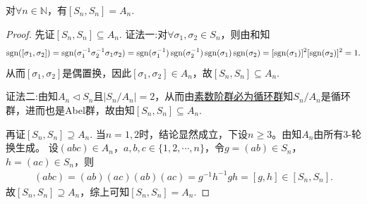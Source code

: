 \documentclass[../../main.tex]{subfiles}%
\begin{document}
\begin{proposition}\label{proposition:SnSn=An}
对$\forall n\in \mathbb{N}$，有$[S_n,S_n] = A_n$.
\end{proposition}
\begin{proof}
先证$[S_n,S_n] \subseteq A_n$.
{\color{blue}证法一:}对$\forall \sigma_1,\sigma_2\in S_n$，则由和知
\begin{align*}
\operatorname{sgn}([\sigma_1,\sigma_2]) = \operatorname{sgn}(\sigma_1^{-1}\sigma_2^{-1}\sigma_1\sigma_2) = \operatorname{sgn}(\sigma_1^{-1})\operatorname{sgn}(\sigma_2^{-1})\operatorname{sgn}(\sigma_1)\operatorname{sgn}(\sigma_2) = [\operatorname{sgn}(\sigma_1)]^2[\operatorname{sgn}(\sigma_2)]^2 = 1.
\end{align*}
从而$[\sigma_1,\sigma_2]$是偶置换，因此$[\sigma_1,\sigma_2]\in A_n$，故$[S_n,S_n] \subseteq A_n$.

{\color{blue}证法二:}由知$A_n\lhd S_n$且$|S_n/A_n|=2$，从而由\hyperref[proposition:素数阶群必为循环群]{素数阶群必为循环群}知$S_n/A_n$是循环群，进而也是Abel群，故由知$[S_n,S_n] \subseteq A_n$.

再证$[S_n,S_n] \supseteq A_n$.
当$n=1,2$时，结论显然成立，下设$n\geqslant 3$。由知$A_n$由所有3-轮换生成。
设$(abc)\in A_n$，$a,b,c\in\{1,2,\cdots,n\}$，令$g=(ab)\in S_n$，$h=(ac)\in S_n$，则
\begin{align*}
(abc) = (ab)(ac)(ab)(ac) = g^{-1}h^{-1}gh = [g,h] \in [S_n,S_n].
\end{align*}
故$[S_n,S_n] \supseteq A_n$，综上可知$[S_n,S_n] = A_n$.
\end{proof}
\end{document}
